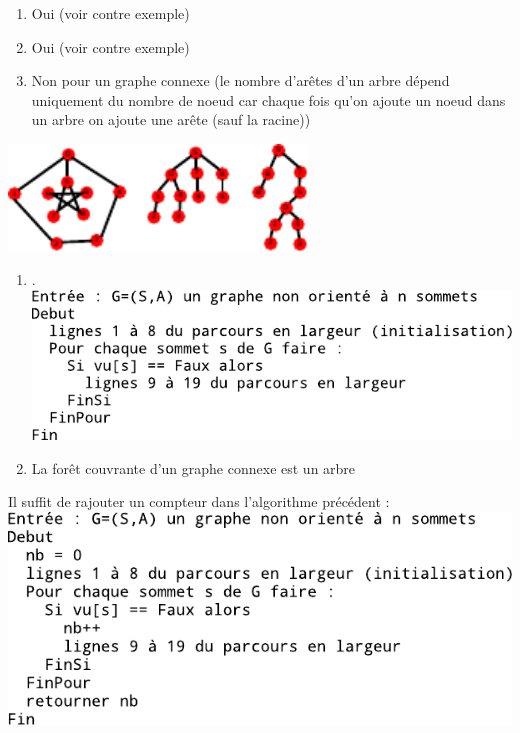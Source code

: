 \begin{enumerate}
	\item Oui (voir contre exemple)
	\item Oui (voir contre exemple)
	\item Non pour un graphe connexe (le nombre d'arêtes d'un arbre dépend uniquement du nombre de noeud car chaque fois qu'on ajoute un noeud dans un arbre on ajoute une arête (sauf la racine))
\end{enumerate}

\includegraphics[width=300px]{Images/fig13.pdf}

\begin{enumerate}
	\item .\\ \includegraphics{Images/fig14.pdf}
	\item La forêt couvrante d'un graphe connexe est un arbre
\end{enumerate}

 Il suffit de rajouter un compteur dans l'algorithme précédent :\\
\includegraphics{Images/fig15.pdf}


